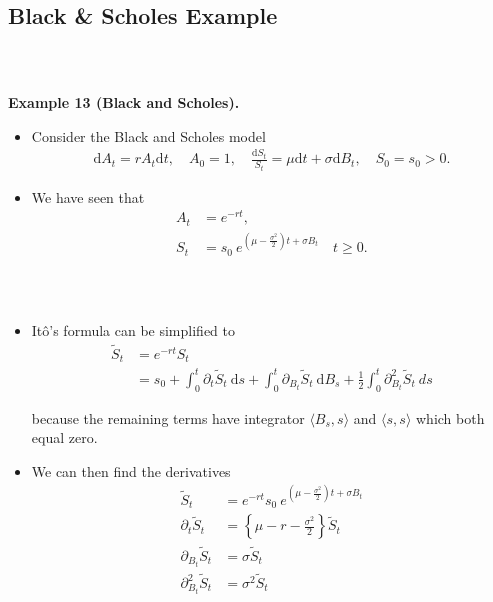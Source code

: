 \documentclass{beamer}
\numberwithin{equation}{section}
\newenvironment{frame2}{\begin{frame}\frametitle{{\normalsize \secname} \\ {\large \subsecname}}}{\end{frame}}
\begin{document}
\subsection{Black \& Scholes Example}
\begin{frame2}
    \textbf{Example 13 (Black and Scholes).}
    \begin{itemize}
        \item Consider the Black and Scholes model
        \begin{align*}
            \text{d}A_t=rA_t\text{d}t, \quad A_0=1, \quad \frac{\text{d}S_t}{S_t}=\mu \text{d}t+\sigma \text{d} B_t, \quad S_0=s_0>0.
        \end{align*}
        \item We have seen that
        \begin{align*}
            A_t&=e^{-rt},\\
            S_t&=s_0 \ e^{(\mu-\frac{\sigma^2}{2})t+\sigma B_t} \quad t \geq 0.
        \end{align*}
    \end{itemize}
\end{frame2}

\begin{frame2}
    \begin{itemize}
        \item Itô's formula can be simplified to
        \begin{align*}
            \tilde{S}_t &= e^{-rt}S_t\\
            &= s_0+\int_0^t\partial_{t}\tilde{S}_t\ \text{d}s + \int_0^t\partial_{B_t}\tilde{S}_t\ \text{d}B_s + \frac{1}{2}\int_0^t\partial_{B_t}^2 \tilde{S}_t \ d s
        \end{align*}

        \begingroup
        \footnotesize
        \color{gray}
        because the remaining terms have integrator $\langle B_s, s \rangle$ and $\langle s,s \rangle$ which both equal zero.
        \endgroup

        \item We can then find the derivatives
        \begin{align*}
            \tilde{S}_t &=e^{-rt}s_0 \ e^{(\mu-\frac{\sigma^2}{2})t+\sigma B_t} \\
            \partial_t \tilde{S}_t &= \left\{ \mu - r -  \frac{\sigma^2}{2}\right\}\tilde{S}_t \\
            \partial_{B_t} \tilde{S}_t &= \sigma \tilde{S}_t \\
            \partial^2_{B_t} \tilde{S}_t &= \sigma^2 \tilde{S}_t
        \end{align*}
    \end{itemize}
\end{frame2}
\end{document}
